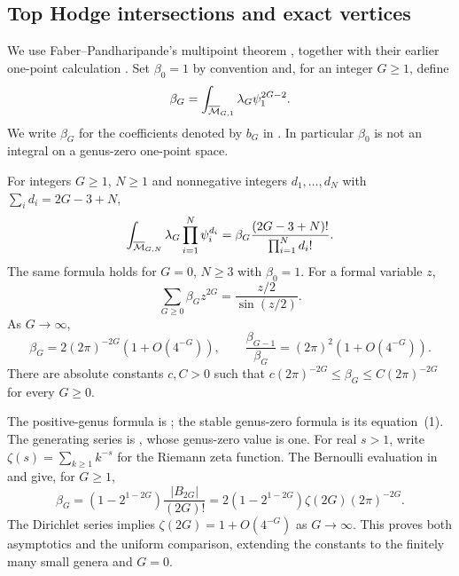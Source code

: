 \subsection{Top Hodge intersections and exact vertices}
\label{subsec:s06:01}

We use Faber--Pandharipande's multipoint theorem
\cite[Theorem~1]{FP03}, together with their earlier one-point
calculation \cite[Theorem~2, (6)]{FP00}. Set $\beta_0=1$ by
convention and, for an integer $G\geq1$, define
\begin{equation}\label{eq:s06:beta-definition}
 \beta_G=\int_{\overline{\mathcal{M}}_{G,1}}\lambda_G\psi_1^{2G-2}.
\end{equation}
We write $\beta_G$ for the coefficients denoted by $b_G$ in
\cite[(3), (6)]{FP00}.
In particular $\beta_0$ is not an integral on a genus-zero one-point
space.

\begin{thm}\label{thm:s06:lambda-g}
For integers $G\geq1$, $N\geq1$ and nonnegative integers
$d_1,\ldots,d_N$ with $\sum_i d_i=2G-3+N$,
\begin{equation}\label{eq:s06:lambda-g}
 \int_{\overline{\mathcal{M}}_{G,N}}\lambda_G\prod_{i=1}^N\psi_i^{d_i}
 =\beta_G\frac{(2G-3+N)!}{\prod_{i=1}^N d_i!}.
\end{equation}
The same formula holds for $G=0$, $N\geq3$ with $\beta_0=1$.
For a formal variable $z$,
\begin{equation}\label{eq:s06:beta-series}
 \sum_{G\geq0}\beta_Gz^{2G}=\frac{z/2}{\sin(z/2)}.
\end{equation}
As $G\to\infty$,
\begin{equation}\label{eq:s06:beta-asymptotics}
 \beta_G=2(2\pi)^{-2G}(1+O(4^{-G})),\qquad
 \frac{\beta_{G-1}}{\beta_G}=(2\pi)^2(1+O(4^{-G})).
\end{equation}
There are absolute constants $c,C>0$ such that
$c(2\pi)^{-2G}\leq\beta_G\leq C(2\pi)^{-2G}$ for every $G\geq0$.
\end{thm}
\begin{prf}
The positive-genus formula is \cite[Theorem~1]{FP03}; the
stable genus-zero formula is its equation~(1). The generating
series is \cite[Theorem~2, (6)]{FP00}, whose genus-zero value is
one. For real $s>1$, write
$\zeta(s)=\sum_{k\geq1}k^{-s}$ for the Riemann zeta function.
The Bernoulli evaluation in \cite[\S 4.2, Lemma~1]{FP00}
and \cite[(25.6.2)]{DLMF} give, for $G\geq1$,
\[
 \beta_G=(1-2^{1-2G})\frac{|B_{2G}|}{(2G)!}
       =2(1-2^{1-2G})\zeta(2G)(2\pi)^{-2G}.
\]
The Dirichlet series \cite[(25.2.1)]{DLMF} implies
$\zeta(2G)=1+O(4^{-G})$ as $G\to\infty$.
This proves both asymptotics and the uniform comparison, extending
the constants to the finitely many small genera and $G=0$.
\end{prf}

